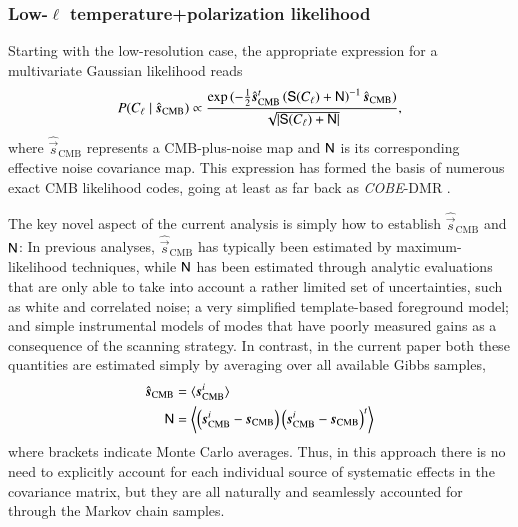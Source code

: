 \documentclass[twocolumn]{aa}
\newcommand{\s}[0]{\vec{s}}
\newcommand{\N}[0]{\tens{N}}
\renewcommand{\S}[0]{\tens{S}}
\begin{document}
\subsubsection{Low-$\ell$ temperature+polarization likelihood}

Starting with the low-resolution case, the appropriate expression for
a multivariate Gaussian likelihood reads
\begin{equation}
  \label{eq:gauss_like}
  P(C_\ell\mid\hat{\s}_{\mathrm{CMB}}) \propto \frac{\exp{(-\frac{1}{2}\hat{\s}_{\mathrm{CMB}}^t
  \left( \S(C_\ell)+\N \right)^{-1}\hat{\s}_{\mathrm{CMB}}})}{\sqrt{|\S(C_\ell)+\N|}},
\end{equation}
where $\hat{\s}_{\mathrm{CMB}}$ represents a CMB-plus-noise map and
$\N$ is its corresponding effective noise covariance map. This
expression has formed the basis of numerous exact CMB likelihood
codes, going at least as far back as \emph{COBE}-DMR
\citep[e.g.,][]{gorski:1994}.

The key novel aspect of the current analysis is simply how to
establish $\hat{\s}_{\mathrm{CMB}}$ and $\N$: In previous analyses,
$\hat{\s}_{\mathrm{CMB}}$ has typically been estimated by
maximum-likelihood techniques, while $\N$ has been estimated through
analytic evaluations that are only able to take into account a rather
limited set of uncertainties, such as white and correlated noise; a
very simplified template-based foreground model; and simple
instrumental models of modes that have poorly measured gains as a consequence 
of the scanning strategy. In contrast, in the current paper both these
quantities are estimated simply by averaging over all available Gibbs
samples,
\begin{align}
  \hat{\s}_{\mathrm{CMB}} &= \langle\s^i_{\mathrm{CMB}}\rangle \\
  \N &= \left\langle\left( \s^i_{\mathrm{CMB}}-\s_{\mathrm{CMB}} \right)
  \left( \s^i_{\mathrm{CMB}}-\s_{\mathrm{CMB}} \right)^t\right\rangle
  \label{eq:postmean}
\end{align}
where brackets indicate Monte Carlo averages. Thus, in this approach
there is no need to explicitly account for each individual source of
systematic effects in the covariance matrix, but they are all
naturally and seamlessly accounted for through the Markov chain
samples.
\end{document}
